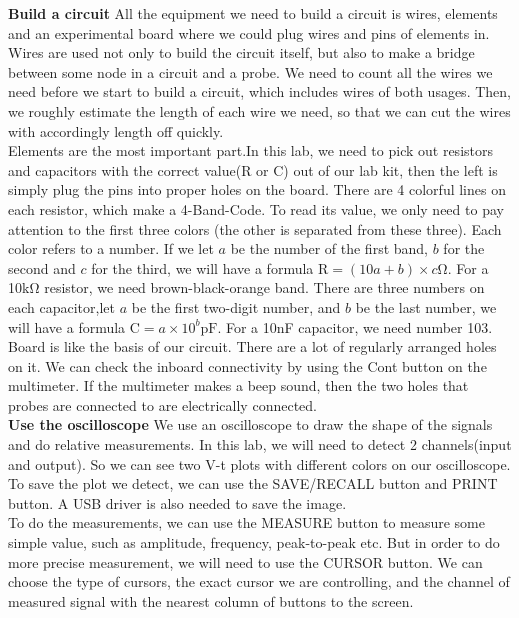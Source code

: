 \textbf{Build a circuit} \newline
\phantom{ } All the equipment we need to build a circuit is wires, elements and an experimental board where we could plug wires and pins of elements in.\\
\phantom{ } Wires are used not only to build the circuit itself, but also to make a bridge between some node in a circuit and a probe. We need to count all the wires we need before we start to build a circuit, which includes wires of both usages. Then, we roughly estimate the length of each wire we need, so that we can cut the wires with accordingly length off quickly.\\
\phantom{ } Elements are the most important part.In this lab, we need to pick out resistors and capacitors with the correct value(R or C) out of our lab kit, then the left is simply plug the pins into proper holes on the board. There are 4 colorful lines on each resistor, which make a 4-Band-Code. To read its value, we only need to pay attention to the first three colors (the other is separated from these three). Each color refers to a number. If we let $a$ be the number of the first band, $b$ for the second and $c$ for the third, we will have a formula $\mathrm{R} = (10a+b)\times c\mathrm{\Omega}$. For a 10k$\mathrm{\Omega}$ resistor, we need brown-black-orange band. There are three numbers on each capacitor,let $a$ be the first two-digit number, and $b$ be the last number, we will have a formula $\mathrm{C} = a \times 10^b \mathrm{pF}$. For a 10nF capacitor, we need number 103.\\
\phantom{ } Board is like the basis of our circuit. There are a lot of regularly arranged holes on it. We can check the inboard connectivity by using the Cont button on the multimeter. If the multimeter makes a beep sound, then the two holes that probes are connected to are electrically connected.\\
\textbf{Use the oscilloscope} \newline
\phantom{ } We use an oscilloscope to draw the shape of the signals and do relative measurements. In this lab, we will need to detect 2 channels(input and output). So we can see two V-t plots with different colors on our oscilloscope. To save the plot we detect, we can use the SAVE/RECALL button and PRINT button. A USB driver is also needed to save the image.\\
\phantom{ } To do the measurements, we can use the MEASURE button to measure some simple value, such as amplitude, frequency, peak-to-peak etc. But in order to do more precise measurement, we will need to use the CURSOR button. We can choose the type of cursors, the exact cursor we are controlling, and the channel of measured signal with the nearest column of buttons to the screen.\\
